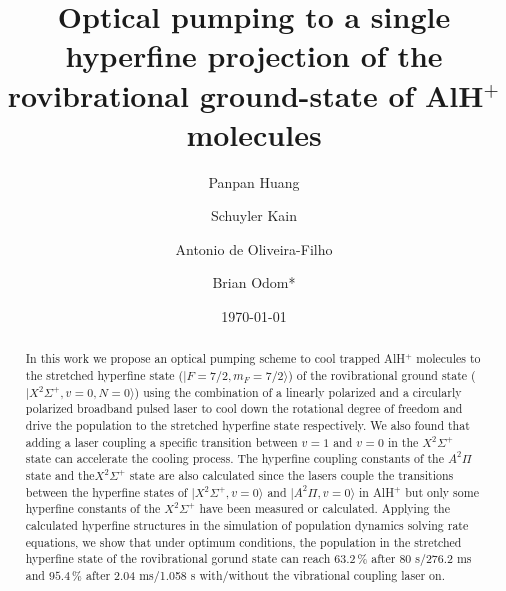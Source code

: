 \documentclass[aip,jcp,reprint]{revtex4-1}
\begin{document}
\title{Optical pumping to a single hyperfine projection of the rovibrational ground-state of AlH$^+$ molecules}

	
	
	\author{Panpan Huang}

	\author{Schuyler Kain}

    \author{Antonio de Oliveira-Filho}

 \author{Brian Odom*}
 
	\date{\today}

\begin{abstract}
In this work we propose an optical pumping scheme to cool trapped AlH$^+$ molecules to the stretched hyperfine state ($\lvert F=7/2, m_F=7/2\rangle$) of the rovibrational ground state ($\lvert X^2\Sigma^+, v=0, N=0\rangle$) using the combination of a linearly polarized and a circularly polarized broadband pulsed laser to cool down the rotational degree of freedom and drive the population to the stretched hyperfine state respectively. We also found that adding a laser coupling a specific transition between $v=1$ and $v=0$ in the  $ X^2\Sigma^+$ state can accelerate the cooling process. The hyperfine coupling constants of the $A^2\Pi$ state and the$X^2\Sigma^+$ state are also calculated since the lasers couple the transitions between the hyperfine states of $\lvert X^2\Sigma^+, v=0\rangle$ and $\lvert A^{2}\Pi, v=0\rangle$ in AlH$^+$ but only some hyperfine constants of the $X^{2}\Sigma^+$ have been measured or calculated. Applying the calculated hyperfine structures in the simulation of population dynamics solving rate equations, we show that under optimum conditions, the population in the stretched hyperfine state of the rovibrational gorund state can reach $63.2\, \%$ after 80 {\micro}s/276.2 ms and $95.4\, \%$ after 2.04 ms/1.058 s with/without the vibrational coupling laser on.
\end{abstract}


	\maketitle
	
\end{document}
